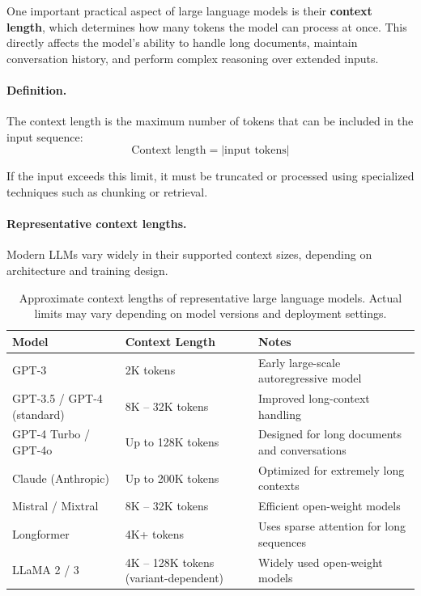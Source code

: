 \documentclass{article}
\begin{document}
One important practical aspect of large language models is their \textbf{context length}, which determines how many tokens the model can process at once. This directly affects the model’s ability to handle long documents, maintain conversation history, and perform complex reasoning over extended inputs.

\paragraph{Definition.}
The context length is the maximum number of tokens that can be included in the input sequence:
\[
\text{Context length} = |\text{input tokens}|
\]

If the input exceeds this limit, it must be truncated or processed using specialized techniques such as chunking or retrieval.

\paragraph{Representative context lengths.}
Modern LLMs vary widely in their supported context sizes, depending on architecture and training design.

\begin{table}[H]
\centering
\begin{tabular}{|p{3.5cm}|p{3cm}|p{5cm}|}
\hline
\textbf{Model} & \textbf{Context Length} & \textbf{Notes} \\
\hline
GPT-3 & 2K tokens & Early large-scale autoregressive model \\
\hline
GPT-3.5 / GPT-4 (standard) & 8K -- 32K tokens & Improved long-context handling \\
\hline
GPT-4 Turbo / GPT-4o & Up to 128K tokens & Designed for long documents and conversations \\
\hline
Claude (Anthropic) & Up to 200K tokens & Optimized for extremely long contexts \\
\hline
Mistral / Mixtral & 8K -- 32K tokens & Efficient open-weight models \\
\hline
Longformer & 4K+ tokens & Uses sparse attention for long sequences \\
\hline
LLaMA 2 / 3 & 4K -- 128K tokens (variant-dependent) & Widely used open-weight models \\
\hline
\end{tabular}
\caption{Approximate context lengths of representative large language models. Actual limits may vary depending on model versions and deployment settings.}
\label{tab:context_length}
\end{table}
\end{document}
